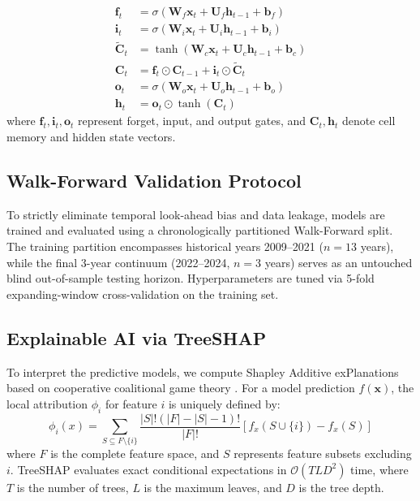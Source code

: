 \documentclass[conference]{IEEEtran}
\begin{document}
\begin{enumerate}
\begin{align}
    \mathbf{f}_t &= \sigma(\mathbf{W}_f \mathbf{x}_t + \mathbf{U}_f \mathbf{h}_{t-1} + \mathbf{b}_f) \\
    \mathbf{i}_t &= \sigma(\mathbf{W}_i \mathbf{x}_t + \mathbf{U}_i \mathbf{h}_{t-1} + \mathbf{b}_i) \\
    \tilde{\mathbf{C}}_t &= \tanh(\mathbf{W}_c \mathbf{x}_t + \mathbf{U}_c \mathbf{h}_{t-1} + \mathbf{b}_c) \\
    \mathbf{C}_t &= \mathbf{f}_t \odot \mathbf{C}_{t-1} + \mathbf{i}_t \odot \tilde{\mathbf{C}}_t \\
    \mathbf{o}_t &= \sigma(\mathbf{W}_o \mathbf{x}_t + \mathbf{U}_o \mathbf{h}_{t-1} + \mathbf{b}_o) \\
    \mathbf{h}_t &= \mathbf{o}_t \odot \tanh(\mathbf{C}_t)
    \end{align}
    where $\mathbf{f}_t, \mathbf{i}_t, \mathbf{o}_t$ represent forget, input, and output gates, and $\mathbf{C}_t, \mathbf{h}_t$ denote cell memory and hidden state vectors.
\end{enumerate}

\subsection{Walk-Forward Validation Protocol}
To strictly eliminate temporal look-ahead bias and data leakage, models are trained and evaluated using a chronologically partitioned Walk-Forward split. The training partition encompasses historical years 2009--2021 ($n = 13$ years), while the final 3-year continuum (2022--2024, $n = 3$ years) serves as an untouched blind out-of-sample testing horizon. Hyperparameters are tuned via 5-fold expanding-window cross-validation on the training set.

\subsection{Explainable AI via TreeSHAP}
To interpret the predictive models, we compute Shapley Additive exPlanations based on cooperative coalitional game theory \cite{lundberg2017unified}. For a model prediction $f(\mathbf{x})$, the local attribution $\phi_i$ for feature $i$ is uniquely defined by:
\begin{equation}
\phi_i(x) = \sum_{S \subseteq F \setminus \{i\}} \frac{|S|!(|F| - |S| - 1)!}{|F|!} \left[ f_x(S \cup \{i\}) - f_x(S) \right]
\end{equation}
where $F$ is the complete feature space, and $S$ represents feature subsets excluding $i$. TreeSHAP evaluates exact conditional expectations in $\mathcal{O}(T L D^2)$ time, where $T$ is the number of trees, $L$ is the maximum leaves, and $D$ is the tree depth.
\end{document}
